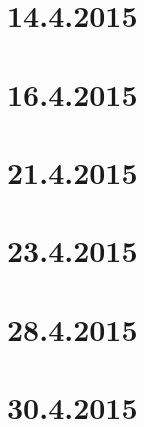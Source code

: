 \documentclass[a4paper,12pt]{scrartcl}
\begin{document}
\section*{14.4.2015}

\section*{16.4.2015}

\section*{21.4.2015}

\section*{23.4.2015}

\section*{28.4.2015}

\section*{30.4.2015}

\end{document}
